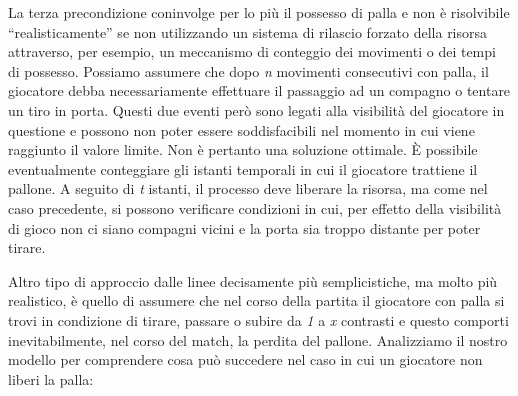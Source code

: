 \documentclass[aps,letterpaper,10pt]{article}
\begin{document}
La terza precondizione coninvolge per lo pi\`u il possesso di palla e non \`e risolvibile ``realisticamente'' se non
utilizzando un sistema di rilascio forzato della risorsa attraverso, per esempio, un meccanismo di conteggio dei
movimenti o dei tempi di possesso. Possiamo assumere che dopo \emph{n} movimenti consecutivi con palla, il giocatore
debba necessariamente effettuare il passaggio ad un compagno o tentare un tiro in porta. Questi due eventi per\`o sono
legati alla visibilit\`a del giocatore in questione e possono non poter essere soddisfacibili nel momento in cui viene
raggiunto il valore limite. Non \`e pertanto una soluzione ottimale. \`E possibile eventualmente conteggiare gli istanti
temporali in cui il giocatore trattiene il pallone. A seguito di \emph{t} istanti, il processo deve liberare la risorsa,
ma come nel caso precedente, si possono verificare condizioni in cui, per effetto della visibilit\`a di gioco non ci
siano compagni vicini e la porta sia troppo distante per poter tirare. \vspace{3mm}

Altro tipo di approccio dalle linee decisamente pi\`u semplicistiche, ma molto pi\`u realistico, \`e quello di assumere
che nel corso della partita il giocatore con palla si trovi in condizione di tirare, passare o subire da \emph{1} a
\emph{x} contrasti e questo comporti inevitabilmente, nel corso del match, la perdita del pallone. Analizziamo il nostro
modello per comprendere cosa pu\`o succedere nel caso in cui un giocatore non liberi la palla:
\end{document}
